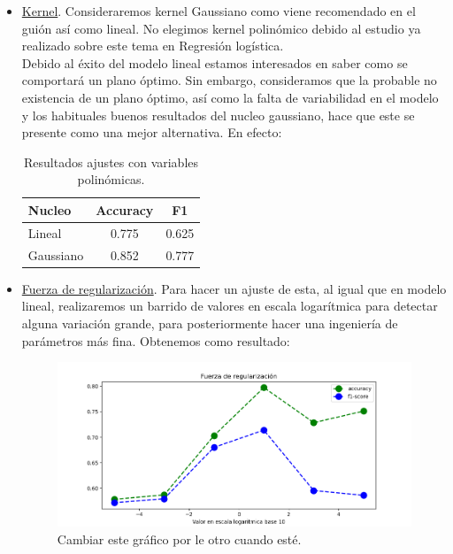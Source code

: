 \documentclass[11pt,a4paper]{article}
\begin{document}
\begin{itemize}
\item \underline{Kernel}. Consideraremos kernel Gaussiano como viene recomendado en el guión así como lineal. No elegimos kernel polinómico debido al estudio ya realizado sobre este tema en Regresión logística.\\

Debido al éxito del modelo lineal estamos interesados en saber como se comportará un plano óptimo. Sin embargo, consideramos que la probable no existencia de un plano
  óptimo, así como la falta de variabilidad en el modelo y los habituales buenos resultados del nucleo gaussiano, hace que este se presente como una mejor alternativa. En efecto:

  
\begin{table}[h]
\begin{center}
\begin{tabular}{|l|c|c|}
\hline
  Nucleo & Accuracy & F1 \\ \hline
Lineal & 0.775 & 0.625 \\
Gaussiano & 0.852 & 0.777  \\\hline
\end{tabular}
\caption{Resultados ajustes con variables polinómicas.}

\end{center}
\end{table}

\item \underline{Fuerza de regularización}. Para hacer un ajuste de esta, al igual que en modelo lineal, realizaremos un barrido de valores en escala logarítmica para detectar alguna variación grande, para posteriormente hacer una ingeniería de parámetros más fina. Obtenemos como resultado:

    \begin{figure}[h!]
      \label{figure:regularization}
      \centering
      \includegraphics[width=\textwidth]{./figures/regularizacion_SVM.png}
      \caption{Cambiar este gráfico por le otro cuando esté.}
    \end{figure}
  

\end{itemize}
\end{document}
